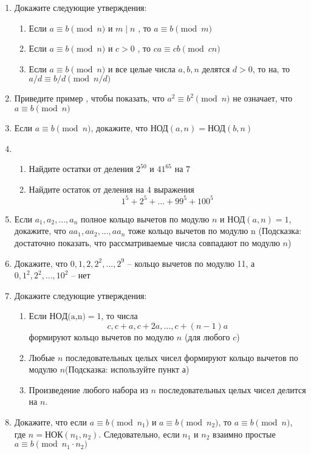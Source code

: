 \documentclass[11pt]{article}
\begin{document}
	\begin{enumerate}
		\item Докажите следующие утверждения:
		\begin{enumerate}
			\item Если $a \equiv b \pmod n$ и  $m\mid n$ , то $a \equiv b \pmod m$
			\item Если $a \equiv b \pmod n$ и  $c>0$ , то $ca \equiv cb \pmod {cn}$
			\item Если $a \equiv b \pmod n$ и все целые числа $a,b,n$ делятся $d>0$, то на, то  ${a / d \equiv b / d \pmod {n / d}}$
		\end{enumerate}
		\item Приведите пример , чтобы показать, что $a^{2}\equiv b^{2} \pmod {	n}$ не означает, что $a\equiv b \pmod {n}$
		\item Если $a\equiv b \pmod {n}$, докажите, что $\text{НОД} (a,n) = \text{НОД} (b,n)$
		\item 
		\begin{enumerate}
			\item Найдите остатки от деления $2^{50}$ и $41^{65}$ на $7$
			\item Найдите остаток от деления на $4$ выражения \[1^{5}+2^{5}+...+99^{5}+100^{5}\] 
		\end{enumerate}
		\item Если $a_1, a_2 , ..., a_n$ полное кольцо вычетов по модулю $n$ и $\text{НОД} (a,n) = 1$, докажите, что 
		${aa_1,aa_2,...,aa_n}$ тоже кольцо вычетов по модулю n (Подсказка: достаточно показать, что рассматриваемые числа  совпадают по модулю $n$) 
		\item Докажите, что $0, 1, 2, 2^{2},...,2^{9}$ -- кольцо вычетов по модулю 11, а $0, 1^{2}, 2^{2},...,10^{2}$ -- нет
		\item Докажите следующие утверждения:
		\begin{enumerate}
			\item Если $НОД\text{(a,n)} = 1$, то числа \[c,c+a,c+2a,...,c+(n-1)a\] формируют кольцо вычетов по модулю $n$ (для любого $c$)
			\item Любые $n$ последовательных целых чисел формируют кольцо вычетов по модулю $n$(Подсказка: используйте пункт а)
			\item Произведение любого набора из $n$ последовательных целых чисел делится на $n$.
		\end{enumerate}
		\item Докажите, что если $a\equiv b \pmod {n_1}$ и $a\equiv b \pmod {n_2}$, то $a\equiv b \pmod {n}$, где $n = \text{НОК}(n_1,n_2)$. Следовательно, если $n_1$ и $n_2$ взаимно простые $a\equiv b \pmod {n_1\cdot n_2}$
		

\end{enumerate}
\end{document}
